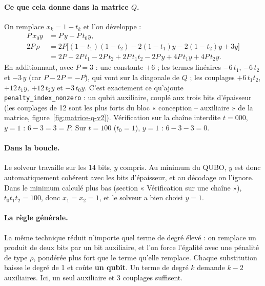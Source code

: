 \paragraph{Ce que cela donne dans la matrice $Q$.} On remplace $x_k=1-t_k$ et l'on développe :
\begin{align*}
P\,x_0y&=P\,y-P\,t_0y,\\
2P\,\rho&=2P\big[(1-t_1)(1-t_2)-2(1-t_1)y-2(1-t_2)y+3y\big]\\
&=2P-2P\,t_1-2P\,t_2+2P\,t_1t_2-2P\,y+4P\,t_1y+4P\,t_2y.
\end{align*}
En additionnant, avec $P=3$ : une constante $+6$ ; les termes linéaires $-6\,t_1$, $-6\,t_2$ et $-3\,y$ (car $P-2P=-P$), qui vont sur la diagonale de $Q$ ; les couplages $+6\,t_1t_2$, $+12\,t_1y$, $+12\,t_2y$ et $-3\,t_0y$. C'est exactement ce qu'ajoute \texttt{penalty\_index\_nonzero} : un qubit auxiliaire, couplé aux trois bits d'épaisseur (les couplages de 12 sont les plus forts du bloc « conception -- auxiliaire » de la matrice, figure~\ref{fig:matrice-q-v2}). Vérification sur la chaîne interdite $t=000$, $y=1$ : $6-3=3=P$. Sur $t=100$ ($t_0=1$), $y=1$ : $6-3-3=0$.

\paragraph{Dans la boucle.} Le solveur travaille sur les 14 bits, $y$ compris. Au minimum du QUBO, $y$ est donc automatiquement cohérent avec les bits d'épaisseur, et au décodage on l'ignore. Dans le minimum calculé plus bas (section « Vérification sur une chaîne »), $t_0t_1t_2=100$, donc $x_1=x_2=1$, et le solveur a bien choisi $y=1$.

\paragraph{La règle générale.} La même technique réduit n'importe quel terme de degré élevé : on remplace un produit de deux bits par un bit auxiliaire, et l'on force l'égalité avec une pénalité de type $\rho$, pondérée plus fort que le terme qu'elle remplace. Chaque substitution baisse le degré de 1 et coûte \textbf{un qubit}. Un terme de degré $k$ demande $k-2$ auxiliaires. Ici, un seul auxiliaire et 3 couplages suffisent.

